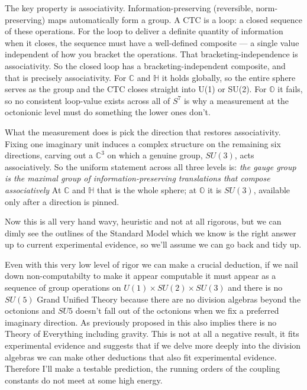 \documentclass{article}
\begin{document}
The key property is associativity. Information-preserving (reversible, norm-preserving) maps automatically form a group. A CTC is a loop: a closed sequence of these operations. For the loop to deliver a definite quantity of information when it closes, the sequence must have a well-defined composite — a single value independent of how you bracket the operations. That bracketing-independence is associativity. So the closed loop has a bracketing-independent composite, and that is precisely associativity. For $\mathbb{C}$ and $\mathbb{H}$ it holds globally, so the entire sphere serves as the group and the CTC closes straight into U(1) or SU(2). For $\mathbb{O}$ it fails, so no consistent loop-value exists across all of $S^7$ is why a measurement at the octonionic level must do something the lower ones don't.

What the measurement does is pick the direction that restores associativity. Fixing one imaginary unit induces a complex structure on the remaining six directions, carving out a $\mathbb{C}^3$ on which a genuine group, $SU(3)$, acts associatively. So the uniform statement across all three levels is: \emph{the gauge group is the maximal group of information-preserving translations that compose associatively} At $\mathbb{C}$ and $\mathbb{H}$ that is the whole sphere; at $\mathbb{O}$ it is $SU(3)$, available only after a direction is pinned.

Now this is all very hand wavy, heuristic and not at all rigorous, but we can dimly see the outlines of the Standard Model which we know is the right answer up to current experimental evidence, so we'll assume we can go back and tidy up. 

Even with this very low level of rigor we can make a crucial deduction, if we nail down non-computabilty to make it appear computable it must appear as a sequence of group operations on $U(1) \times SU(2) \times SU(3)$ and there is no $SU(5)$ Grand Unified Theory because there are no division algebras beyond the octonions \autocite{hurwitz_1898} and $SU{5}$ doesn't fall out of the octonions when we fix a preferred imaginary direction. As previously proposed in \autocite{small_2006} this also implies there is no Theory of Everything including gravity. This is not at all a negative result, it fits experimental evidence and suggests that if we delve more deeply into the division algebras we can make other deductions that also fit experimental evidence. Therefore I'll make a testable prediction, the running orders of the coupling constants do not meet at some high energy. 
\end{document}
